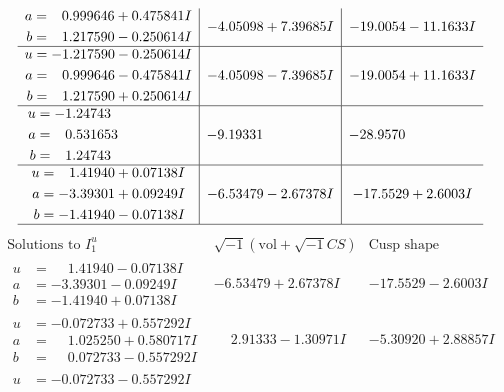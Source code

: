 \documentclass[1p]{elsarticle_modified}
\theoremstyle{definition}
\newcommand{\I}{\sqrt{-1}}
\begin{document}
$$\begin{array}{c|c|c}
\begin{aligned}
a &= \phantom{-}0.999646 + 0.475841 I \\
b &= \phantom{-}1.217590 - 0.250614 I\end{aligned}
 & -4.05098 + 7.39685 I & -19.0054 - 11.1633 I \\ \hline\begin{aligned}
u &= -1.217590 - 0.250614 I \\
a &= \phantom{-}0.999646 - 0.475841 I \\
b &= \phantom{-}1.217590 + 0.250614 I\end{aligned}
 & -4.05098 - 7.39685 I & -19.0054 + 11.1633 I \\ \hline\begin{aligned}
u &= -1.24743\phantom{ +0.000000I} \\
a &= \phantom{-}0.531653\phantom{ +0.000000I} \\
b &= \phantom{-}1.24743\phantom{ +0.000000I}\end{aligned}
 & -9.19331\phantom{ +0.000000I} & -28.9570\phantom{ +0.000000I} \\ \hline\begin{aligned}
u &= \phantom{-}1.41940 + 0.07138 I \\
a &= -3.39301 + 0.09249 I \\
b &= -1.41940 - 0.07138 I\end{aligned}
 & -6.53479 - 2.67378 I & -17.5529 + 2.6003 I\\
 \hline 
 \end{array}$$\newpage$$\begin{array}{c|c|c}  
\text{Solutions to }I^u_{1}& \I (\text{vol} + \sqrt{-1}CS) & \text{Cusp shape}\\
 \hline 
\begin{aligned}
u &= \phantom{-}1.41940 - 0.07138 I \\
a &= -3.39301 - 0.09249 I \\
b &= -1.41940 + 0.07138 I\end{aligned}
 & -6.53479 + 2.67378 I & -17.5529 - 2.6003 I \\ \hline\begin{aligned}
u &= -0.072733 + 0.557292 I \\
a &= \phantom{-}1.025250 + 0.580717 I \\
b &= \phantom{-}0.072733 - 0.557292 I\end{aligned}
 & \phantom{-}2.91333 - 1.30971 I & -5.30920 + 2.88857 I \\ \hline\begin{aligned}
u &= -0.072733 - 0.557292 I \\

\end{aligned}
\end{array}$$
\end{document}
